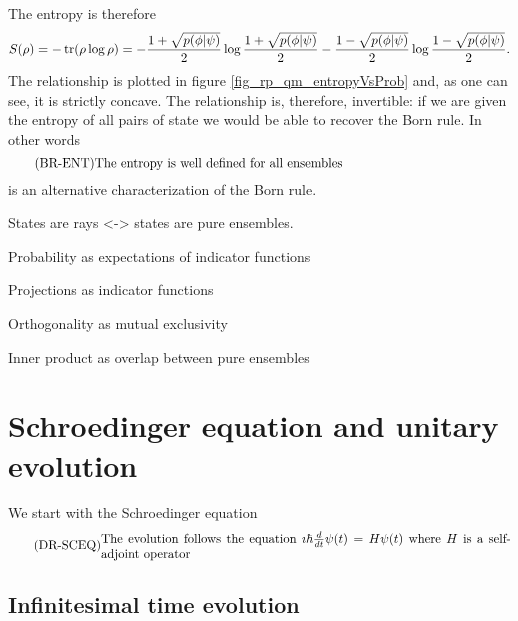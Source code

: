 The entropy is therefore
\begin{equation}
	\begin{aligned}
		S(\rho) = - \operatorname{tr}(\rho \log \rho) = - \frac{1+\sqrt{p(\phi|\psi)}}{2} \log \frac{1+\sqrt{p(\phi|\psi)}}{2} - \frac{1-\sqrt{p(\phi|\psi)}}{2} \log \frac{1-\sqrt{p(\phi|\psi)}}{2}.
	\end{aligned}
\end{equation}
The relationship is plotted in figure \ref{fig_rp_qm_entropyVsProb} and, as one can see, it is strictly concave. The relationship is, therefore, invertible: if we are given the entropy of all pairs of state we would be able to recover the Born rule. In other words
\begin{equation}\label{rp-qm-br-condExpectations}
	\tag{BR-ENT}
	\eqtext{The entropy is well defined for all ensembles} 
\end{equation}
is an alternative characterization of the Born rule.


States are rays <-> states are pure ensembles.

Probability as expectations of indicator functions

Projections as indicator functions

Orthogonality as mutual exclusivity

Inner product as overlap between pure ensembles

\section{Schroedinger equation and unitary evolution}

We start with the Schroedinger equation
\begin{equation}\label{rp-qm-uev-condSchroedingerEq}
	\tag{DR-SCEQ}
	\eqtext{The evolution follows the equation $\imath \hbar \frac{d}{dt} \psi(t) = H \psi(t)$ where $H$ is a self-adjoint operator}
\end{equation}

\subsection{Infinitesimal time evolution}

